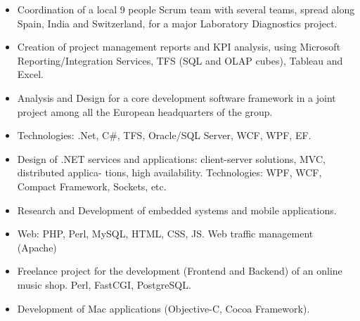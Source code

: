 \documentclass[10pt,a4paper]{altacv}
\begin{document}
\begin{itemize}
	\item Coordination of a local 9 people Scrum team with several teams, spread along Spain, India and Switzerland, for a major Laboratory Diagnostics project.
	\item Creation of project management reports and KPI analysis, using Microsoft Reporting/Integration Services, TFS (SQL and OLAP cubes), Tableau and Excel.
\end{itemize}

\divider

\begin{itemize}
	\item Analysis and Design for a core development software framework in a joint project among all the European headquarters of the group.
	\item Technologies: .Net, C\#, TFS, Oracle/SQL Server, WCF, WPF, EF.
\end{itemize}


\divider

\begin{itemize}
	\item Design of .NET services and applications: client-server solutions, MVC, distributed applica-
	tions, high availability. Technologies: WPF, WCF, Compact Framework, Sockets, etc.
	\item Research and Development of embedded systems and mobile applications.
\end{itemize}

\divider

\begin{itemize}
	\item Web: PHP, Perl, MySQL, HTML, CSS, JS. Web traffic management (Apache)
\end{itemize}



\begin{itemize}
	\item Freelance project for the development (Frontend and Backend) of an online music shop. Perl, FastCGI, PostgreSQL.
	\item Development of Mac applications (Objective-C, Cocoa Framework).
\end{itemize}
\end{document}
